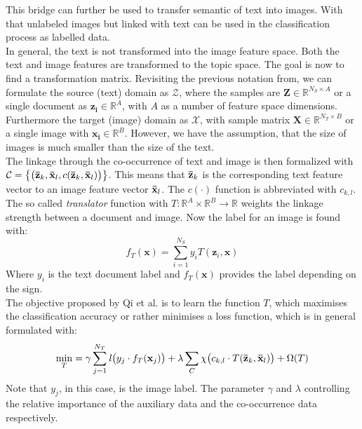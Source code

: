 This bridge can further be used to transfer semantic of text into images.
With that unlabeled images but linked with text can be used in the classification process as labelled data.
\cite{Qi.2011}\\
In general, the text is not transformed into the image feature space.
Both the text and image features are transformed to the topic space.
The goal is now to find a transformation matrix.
Revisiting the previous notation from, we can formulate the source (text) domain as $\mathcal{Z}$, where the samples are $\mathbf{Z} \in \mathbb{R}^{N_S\times A}$ or a single document as $\mathbf{z_i}\in \mathbb{R}^A$, with $A$ as a number of feature space dimensions.
Furthermore the target (image) domain as $\mathcal{X}$, with sample matrix $\mathbf{X} \in \mathbb{R}^{N_T\times B}$ or a single image with $\mathbf{x_i}\in\mathbb{R}^B$.
However, we have the assumption, that the size of images is much smaller than the size of the text.\cite{Qi.2011}\\
The linkage through the co-occurrence of text and image is then formalized with $\mathcal{C} = \big\{\big( \mathbf{\bar{z}}_k,\mathbf{\bar{x}}_l,c( \mathbf{\bar{z}}_k,\mathbf{\bar{x}}_l) \big)\big\}$.
This means that $\mathbf{\bar{z}}_k$ is the corresponding text feature vector to an image feature vector $\mathbf{\bar{x}}_l$.
The $c(\cdot)$ function is abbreviated with $c_{k,l}$.\cite{Qi.2011}\\
The so called \textit{translator} function with $T : \mathbb{R}^A \times \mathbb{R}^B \to \mathbb{R}$ weights the linkage strength between a document and image.
Now the label for an image is found with:\cite{Qi.2011}
\begin{equation}
	f_T (\mathbf{x}) = \sum_{i=1}^{N_S} y_i T(\mathbf{z}_i,\mathbf{x})
\end{equation}
Where $y_i$ is the text document label and     $f_T (\mathbf{x})$ provides the label depending on the sign.\\
The objective proposed by Qi et al. is to learn the function $T$, which maximises the classification accuracy or rather minimises a loss function, which is in general formulated with:\cite{Qi.2011}
\begin{equation}\label{EqTTIGeneralOpt}
	\min_{T} = \gamma \sum_{j=1}^{N_T}\mathit{l}\big( y_j \cdot f_T(\mathbf{x}_j) \big) + \lambda \sum_{C}  \chi \big( c_{k,l} \cdot T(\mathbf{\bar{z}}_k,\mathbf{\bar{x}}_l)\big) + \Omega(T)
\end{equation}
Note that $y_j$, in this case, is the image label.
The parameter $\gamma$ and $\lambda$ controlling the relative importance of the auxiliary data and the co-occurrence data respectively.
